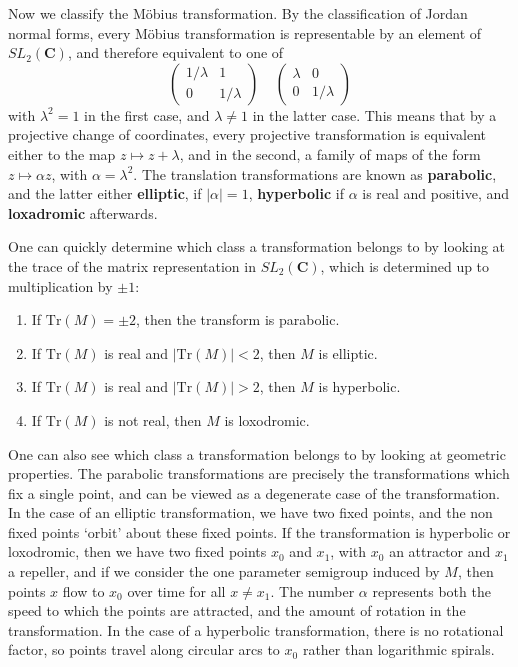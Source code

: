 Now we classify the M\"{o}bius transformation. By the classification of Jordan normal forms, every M\"{o}bius transformation is representable by an element of $SL_2(\mathbf{C})$, and therefore equivalent to one of
%
\[ \begin{pmatrix} 1/\lambda & 1 \\ 0 & 1/\lambda \end{pmatrix}\ \ \ \ \ \begin{pmatrix} \lambda & 0 \\ 0 & 1/\lambda \end{pmatrix} \]
%
with $\lambda^2 = 1$ in the first case, and $\lambda \neq 1$ in the latter case. This means that by a projective change of coordinates, every projective transformation is equivalent either to the map $z \mapsto z + \lambda$, and in the second, a family of maps of the form $z \mapsto \alpha z$, with $\alpha = \lambda^2$. The translation transformations are known as {\bf parabolic}, and the latter either {\bf elliptic}, if $|\alpha| = 1$, {\bf hyperbolic} if $\alpha$ is real and positive, and {\bf loxadromic} afterwards.

One can quickly determine which class a transformation belongs to by looking at the trace of the matrix representation in $SL_2(\mathbf{C})$, which is determined up to multiplication by $\pm 1$:
%
\begin{enumerate}
    \item If $\text{Tr}(M) = \pm 2$, then the transform is parabolic.
    \item If $\text{Tr}(M)$ is real and $|\text{Tr}(M)| < 2$, then $M$ is elliptic.
    \item If $\text{Tr}(M)$ is real and $|\text{Tr}(M)| > 2$, then $M$ is hyperbolic.
    \item If $\text{Tr}(M)$ is not real, then $M$ is loxodromic.
\end{enumerate}
%
One can also see which class a transformation belongs to by looking at geometric properties. The parabolic transformations are precisely the transformations which fix a single point, and can be viewed as a degenerate case of the transformation. In the case of an elliptic transformation, we have two fixed points, and the non fixed points `orbit' about these fixed points. If the transformation is hyperbolic or loxodromic, then we have two fixed points $x_0$ and $x_1$, with $x_0$ an attractor and $x_1$ a repeller, and if we consider the one parameter semigroup induced by $M$, then points $x$ flow to $x_0$ over time for all $x \neq x_1$. The number $\alpha$ represents both the speed to which the points are attracted, and the amount of rotation in the transformation. In the case of a hyperbolic transformation, there is no rotational factor, so points travel along circular arcs to $x_0$ rather than logarithmic spirals.

